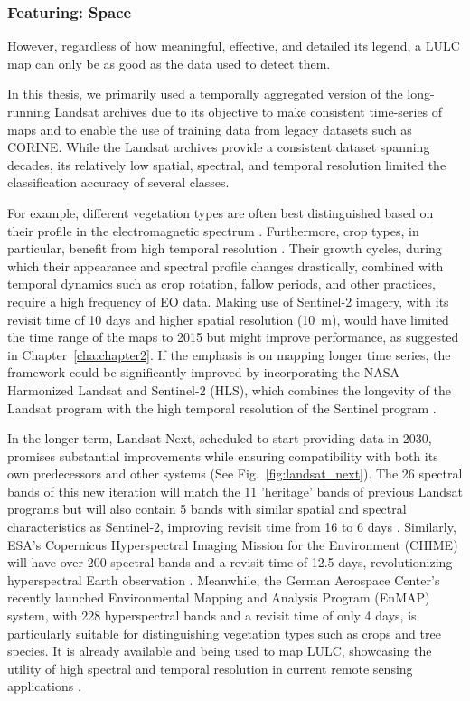         \subsubsection{Featuring: Space}

            However, regardless of how meaningful, effective, and detailed its legend, a LULC map can only be as good as the data used to detect them. 
            
            In this thesis, we primarily used a temporally aggregated version of the long-running Landsat archives due to its objective to make consistent time-series of maps and to enable the use of training data from legacy datasets such as CORINE. While the Landsat archives provide a consistent dataset spanning decades, its relatively low spatial, spectral, and temporal resolution limited the classification accuracy of several classes. 
            
            For example, different vegetation types are often best distinguished based on their profile in the electromagnetic spectrum \citep{xu2021towards,hennessy2020hyperspectral, neinavaz2021thermal}. Furthermore, crop types, in particular, benefit from high temporal resolution \citep{esch2014differentiation,xu2021towards}. Their growth cycles, during which their appearance and spectral profile changes drastically, combined with temporal dynamics such as crop rotation, fallow periods, and other practices, require a high frequency of EO data. Making use of Sentinel-2 imagery, with its revisit time of 10 days and higher spatial resolution (10~m), would have limited the time range of the maps to 2015 but might improve performance, as suggested in Chapter\@~\ref{cha:chapter2}. If the emphasis is on mapping longer time series, the framework could be significantly improved by incorporating the NASA Harmonized Landsat and Sentinel-2 (HLS), which combines the longevity of the Landsat program with the high temporal resolution of the Sentinel program \citep{claverie2018harmonized}.
            
            In the longer term, Landsat Next, scheduled to start providing data in 2030, promises substantial improvements while ensuring compatibility with both its own predecessors and other systems (See Fig.\@~\ref{fig:landsat_next}). The 26 spectral bands of this new iteration will match the 11 'heritage' bands of previous Landsat programs but will also contain 5 bands with similar spatial and spectral characteristics as Sentinel-2, improving revisit time from 16 to 6 days \citep{landsatnext2023}. Similarly, ESA's Copernicus Hyperspectral Imaging Mission for the Environment (CHIME) will have over 200 spectral bands and a revisit time of 12.5 days, revolutionizing hyperspectral Earth observation \citep{nieke2023copernicus}. Meanwhile, the German Aerospace Center's recently launched Environmental Mapping and Analysis Program (EnMAP) system, with 228 hyperspectral bands and a revisit time of only 4 days, is particularly suitable for distinguishing vegetation types such as crops and tree species. It is already available and being used to map LULC, showcasing the utility of high spectral and temporal resolution in current remote sensing applications \citep{storch2023enmap, lekka2024appraisal}.
    
